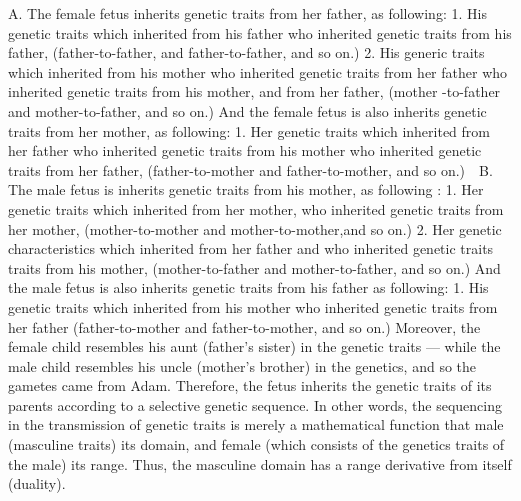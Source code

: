 \begin{Summary}
{{{{A. The female fetus inherits genetic traits from her father, as following: 
1. His genetic traits which inherited from his father who inherited genetic traits from his father, (father-to-father, and father-to-father, and so on.)
2. His generic traits which inherited from his mother who inherited genetic traits from her father who inherited genetic traits from his mother, and from her father, (mother -to-father and mother-to-father, and so on.) 
And the female fetus is also inherits genetic traits from her mother, as following:
1. Her genetic traits which inherited from her father who inherited genetic traits from his mother who inherited genetic traits from her father, (father-to-mother and father-to-mother, and so on.)
 
B. The male fetus is inherits genetic traits from his mother, as following :
1. Her genetic traits which inherited from her mother, who inherited genetic traits from her mother, (mother-to-mother and mother-to-mother,and so on.)
2. Her genetic characteristics which inherited from her father and who inherited genetic traits traits from his mother, (mother-to-father and  mother-to-father, and so on.)
And the male fetus is also inherits  genetic traits from his father as following:
1. His genetic traits which inherited from his mother who inherited genetic traits from her father (father-to-mother and  father-to-mother, and so on.)
Moreover, the female child resembles his aunt (father's sister) in the genetic traits — while the male child resembles his uncle (mother's brother) in the genetics, and so the gametes came from Adam. Therefore, the fetus inherits the genetic traits of its parents according to a selective genetic sequence. In other words, the sequencing in the transmission of genetic traits is merely a mathematical function that male (masculine traits) its domain, and female (which consists of the genetics traits of the male) its range. Thus, the masculine domain has a range derivative from itself (duality). 
}}}}
\end{Summary}

